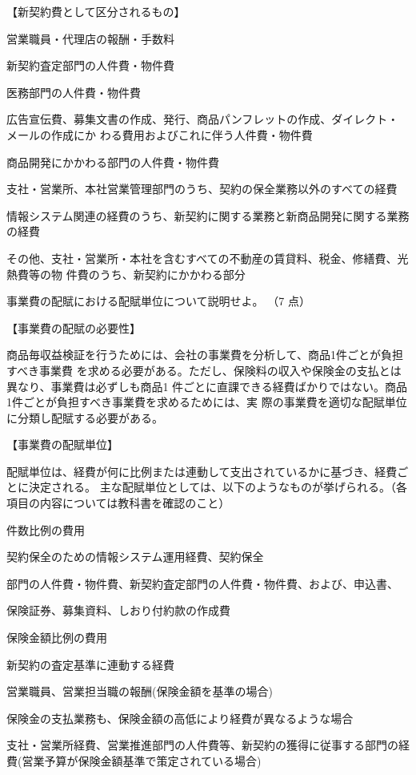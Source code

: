 \documentclass[report,gutter=10mm,fore-edge=10mm,uplatex,dvipdfmx]{jlreq}
\begin{document}
【新契約費として区分されるもの】

営業職員・代理店の報酬・手数料

新契約査定部門の人件費・物件費

医務部門の人件費・物件費

広告宣伝費、募集文書の作成、発行、商品パンフレットの作成、ダイレクト・メールの作成にか
わる費用およびこれに伴う人件費・物件費

商品開発にかかわる部門の人件費・物件費

支社・営業所、本社営業管理部門のうち、契約の保全業務以外のすべての経費

情報システム関連の経費のうち、新契約に関する業務と新商品開発に関する業務の経費

その他、支社・営業所・本社を含むすべての不動産の賃貸料、税金、修繕費、光熱費等の物
件費のうち、新契約にかかわる部分

事業費の配賦における配賦単位について説明せよ。
（7 点）

\answer{}

【事業費の配賦の必要性】

商品毎収益検証を行うためには、会社の事業費を分析して、商品1件ごとが負担すべき事業費
を求める必要がある。ただし、保険料の収入や保険金の支払とは異なり、事業費は必ずしも商品1
件ごとに直課できる経費ばかりではない。商品1件ごとが負担すべき事業費を求めるためには、実
際の事業費を適切な配賦単位に分類し配賦する必要がある。

【事業費の配賦単位】

配賦単位は、経費が何に比例または連動して支出されているかに基づき、経費ごとに決定される。
主な配賦単位としては、以下のようなものが挙げられる。（各項目の内容については教科書を確認のこと）

件数比例の費用

契約保全のための情報システム運用経費、契約保全

部門の人件費・物件費、新契約査定部門の人件費・物件費、および、申込書、

保険証券、募集資料、しおり付約款の作成費


保険金額比例の費用

新契約の査定基準に連動する経費

営業職員、営業担当職の報酬(保険金額を基準の場合)

保険金の支払業務も、保険金額の高低により経費が異なるような場合

支社・営業所経費、営業推進部門の人件費等、新契約の獲得に従事する部門の経費(営業予算が保険金額基準で策定されている場合)
\end{document}
